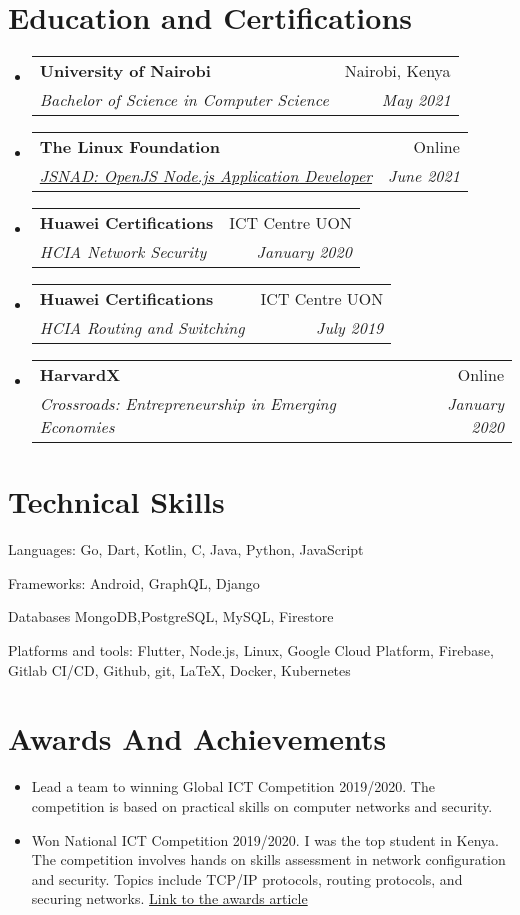 \documentclass[letterpaper,11pt]{article}
\makeatletter
\newcommand{\resumeSubheading}[4]{
    \vspace{-1pt}\item
    \begin{tabular*}{0.97\textwidth}[t]{l@{\extracolsep{\fill}}r}
        \textbf{#1} & #2 \\
        \textit{\small#3} & \textit{\small #4} \\
    \end{tabular*}\vspace{-5pt}
}
\newcommand{\resumeSubHeadingListStart}{\begin{itemize}[leftmargin=*]}        \newcommand{\resumeSubHeadingListEnd}{\end{itemize}}
\newcommand{\skillListStart}{\begin{description}[leftmargin=*,noitemsep]}
\newcommand{\skillListEnd}{\end{description}}
\makeatother
\begin{document}
\section{Education and Certifications}

\resumeSubHeadingListStart

\resumeSubheading{University of Nairobi}{Nairobi, Kenya}{Bachelor of Science in Computer Science }{May 2021}

\resumeSubheading{The Linux Foundation}{Online}{\href{https://www.credly.com/badges/ab918a14-4dfd-4800-be45-a6a3a8fbd96c/linked_in}{JSNAD: OpenJS Node.js Application Developer}}{June 2021}

\resumeSubheading{Huawei Certifications}{ICT Centre UON}{HCIA Network Security }{January 2020}

\resumeSubheading{Huawei Certifications}{ICT Centre UON}{HCIA Routing and Switching  }{July 2019}

\resumeSubheading{HarvardX}{Online}{Crossroads: Entrepreneurship in Emerging Economies  }{January 2020}

\resumeSubHeadingListEnd

\section{Technical Skills}

\skillListStart

\item[Languages: ] Go, Dart, Kotlin, C, Java, Python, JavaScript

\item[Frameworks: ] Android, GraphQL, Django

\item[Databases]            MongoDB,PostgreSQL, MySQL, Firestore

\item [Platforms and tools:] Flutter, Node.js, Linux, Google Cloud Platform, Firebase, Gitlab CI/CD, Github, git, \LaTeX, Docker, Kubernetes

\skillListEnd


\section{Awards And Achievements}

\begin{itemize}[noitemsep]
    \item Lead a team to winning Global ICT Competition 2019/2020. The competition is based on practical skills on computer networks and security.
    \item Won National ICT Competition 2019/2020. I was the top student in Kenya. The competition involves hands on skills assessment in network configuration and security. Topics include TCP/IP protocols, routing protocols, and securing networks. \href{https://www.uonbi.ac.ke/news/uon-student-wins-huawei-network-cloud-track-award}{Link to the awards article}
\end{itemize}
\end{document}
